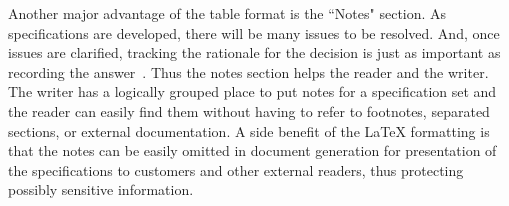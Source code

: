 \if@showreqnotes
Another major advantage of the table format is the ``Notes" section.
As specifications are developed, there will be many issues to be resolved.
And, once issues are clarified, tracking the rationale for the decision is just as important as recording the answer~\cite{ref__Brooks_MMM}.
Thus the notes section helps the reader and the writer.
The writer has a logically grouped place to put notes for a specification set and the reader can easily find them without having to refer to footnotes, separated sections, or external documentation.
A side benefit of the \LaTeX{} formatting is that the notes can be easily omitted in document generation for presentation of the specifications to customers and other external readers, thus protecting possibly sensitive information.
\fi%